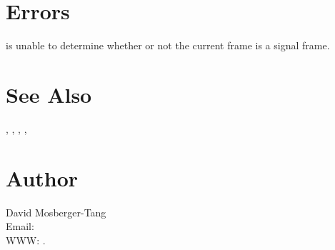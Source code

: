 \documentclass{article}
\begin{document}
\section{Errors}

\begin{Description}
\item[\Const{UNW\_ENOINFO}]  is unable to determine
  whether or not the current frame is a signal frame.
\end{Description}

\section{See Also}

,
,
,
,

\section{Author}

\noindent
David Mosberger-Tang\\
Email: \\
WWW: .
\LatexManEnd
\end{document}
